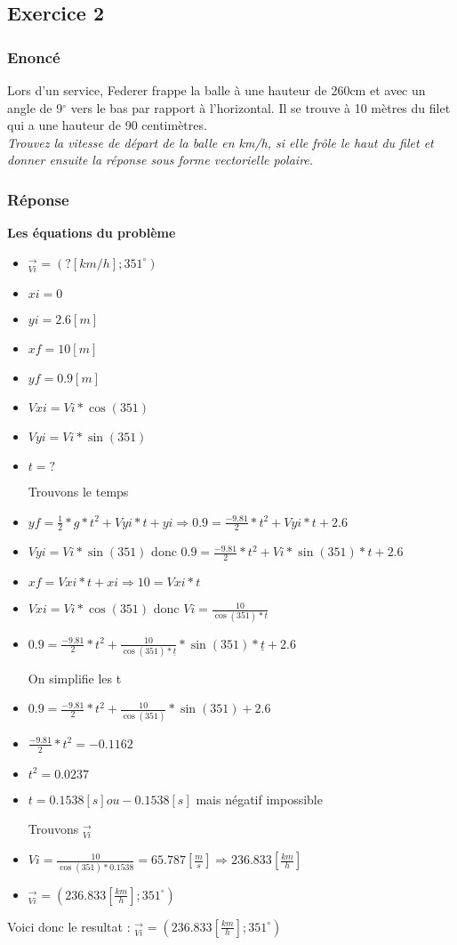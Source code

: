 \subsection{Exercice 2}
\subsubsection{Enoncé}
Lors d'un service, Federer frappe la balle à une hauteur de 260cm et avec un angle de 9$^{\circ}$ vers le bas par rapport à l'horizontal. Il se trouve à 10 mètres du filet qui a une hauteur de 90 centimètres.
\\
\textit{Trouvez la vitesse de départ de la balle en km/h, si elle frôle le haut du filet et donner ensuite la réponse sous forme vectorielle polaire.}

\subsubsection{Réponse}
\textbf{Les équations du problème}
\begin{itemize}
    \item $_{Vi}^\rightarrow = (?[km/h];351^\circ)$
    \item $xi = 0$
    \item $yi = 2.6 [m]$
    \item $xf = 10 [m]$
    \item $yf = 0.9 [m]$
    \item $Vxi = Vi * \cos(351)$
    \item $Vyi = Vi * \sin(351)$
    \item $t = ?$
\end{itemize}
\begin{itemize}
    \item[Trouvons le temps]
    \item $yf=\frac{1}{2}*g*t^2+Vyi * t + yi \Rightarrow 0.9 = \frac{-9.81}{2}*t^2 + Vyi * t + 2.6$
    \item $Vyi = Vi * \sin(351)$ donc $0.9 = \frac{-9.81}{2}*t^2 + Vi * \sin(351) * t + 2.6$
    \item $xf = Vxi * t + xi  \Rightarrow 10 = Vxi * t$
    \item $Vxi = Vi * \cos(351)$ donc $Vi = \frac{10}{\cos(351)*t}$
    \item $0.9 = \frac{-9.81}{2}*t^2 + \frac{10}{\cos(351) * \underline{t}} * \sin(351) * \underline{t} + 2.6$
    \item[On simplifie les t]
    \item $0.9 = \frac{-9.81}{2}*t^2 + \frac{10}{\cos(351)} * \sin(351) + 2.6$
    \item $\frac{-9.81}{2}*t^2 = -0.1162$
    \item $t^2 = 0.0237$
    \item $t = 0.1538[s] ou -0.1538[s]$ mais négatif impossible
    \item[Trouvons $_{Vi}^\rightarrow$]
    \item $Vi = \frac{10}{\cos(351)*0.1538} = 65.787 [\frac{m}{s}] \Rightarrow 236.833 [\frac{km}{h}]$
    \item $_{Vi}^\rightarrow = (236.833[\frac{km}{h}];351^\circ)$
\end{itemize}
Voici donc le resultat : $_{Vi}^\rightarrow = (236.833[\frac{km}{h}];351^\circ)$

